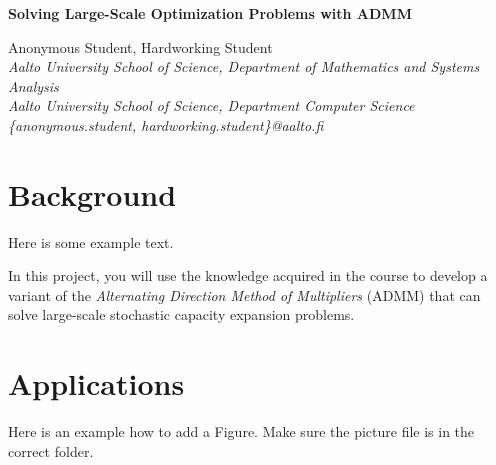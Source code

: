 \documentclass[a4paper]{artikel3}
\begin{document}
\begin{center}
{\Large \onehalfspacing \bf Solving Large-Scale Optimization Problems with ADMM}
\end{center}
\vspace{10pt}


\begin{center}
Anonymous Student, Hardworking Student\\ 
{\textit{{\small{Aalto University School of Science, Department of Mathematics and Systems Analysis\\
		         Aalto University School of Science, Department Computer Science\\ 
		         \{anonymous.student, hardworking.student\}@aalto.fi}}}}
\end{center}


\section{Background}

Here is some example text.

In this project, you will use the knowledge acquired in the course to develop a variant of the \emph{Alternating Direction Method of Multipliers} (ADMM) that can solve large-scale stochastic capacity expansion problems.

\section{Applications}


Here is an example how to add a Figure. Make sure the picture file is in the correct folder.
\end{document}
